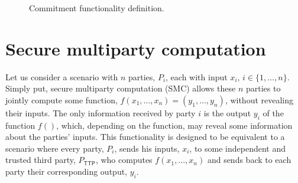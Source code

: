 \begin{figure}[!h]
\centering
{}
\caption{Commitment functionality definition.}
\label{fig:func_com}
\end{figure}




\section{Secure multiparty computation}

Let us consider a scenario with $n$ parties, $P_i$, each with input $x_i$, $i\in \{ 1, ..., n\}$. Simply put, secure multiparty computation (SMC) allows these $n$ parties to jointly compute some function, $f( x_1, ..., x_n ) = (y_1, ..., y_n)$, without revealing their inputs. The only information received by party $i$ is the output $y_i$ of the function $f()$, which, depending on the function, may reveal some information about the parties' inputs. This functionality is designed to be equivalent to a scenario where every party, $P_i$, sends his inputs, $x_i$, to some independent and trusted third party, $P_{\mathsf{TTP}}$, who computes $f( x_1, ..., x_n )$ and sends back to each party their corresponding output, $y_i$.

